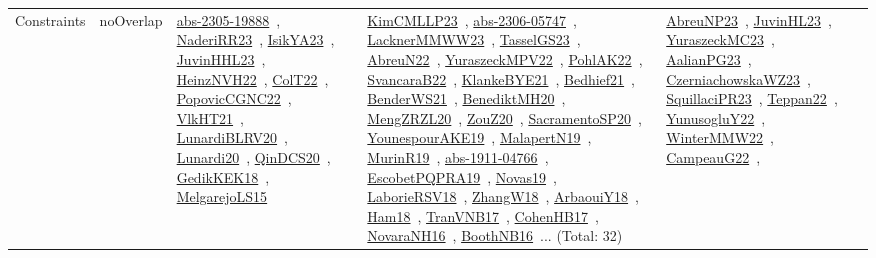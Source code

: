 {\begin{longtable}{lp{3cm}>{\raggedright\arraybackslash}p{6cm}>{\raggedright\arraybackslash}p{6cm}>{\raggedright\arraybackslash}p{8cm}}
Constraints & noOverlap & \href{works/abs-2305-19888.pdf}{abs-2305-19888}~\cite{abs-2305-19888}, \href{works/NaderiRR23.pdf}{NaderiRR23}~\cite{NaderiRR23}, \href{works/IsikYA23.pdf}{IsikYA23}~\cite{IsikYA23}, \href{works/JuvinHHL23.pdf}{JuvinHHL23}~\cite{JuvinHHL23}, \href{works/HeinzNVH22.pdf}{HeinzNVH22}~\cite{HeinzNVH22}, \href{works/ColT22.pdf}{ColT22}~\cite{ColT22}, \href{works/PopovicCGNC22.pdf}{PopovicCGNC22}~\cite{PopovicCGNC22}, \href{works/VlkHT21.pdf}{VlkHT21}~\cite{VlkHT21}, \href{works/LunardiBLRV20.pdf}{LunardiBLRV20}~\cite{LunardiBLRV20}, \href{works/Lunardi20.pdf}{Lunardi20}~\cite{Lunardi20}, \href{works/QinDCS20.pdf}{QinDCS20}~\cite{QinDCS20}, \href{works/GedikKEK18.pdf}{GedikKEK18}~\cite{GedikKEK18}, \href{works/MelgarejoLS15.pdf}{MelgarejoLS15}~\cite{MelgarejoLS15} & \href{works/KimCMLLP23.pdf}{KimCMLLP23}~\cite{KimCMLLP23}, \href{works/abs-2306-05747.pdf}{abs-2306-05747}~\cite{abs-2306-05747}, \href{works/LacknerMMWW23.pdf}{LacknerMMWW23}~\cite{LacknerMMWW23}, \href{works/TasselGS23.pdf}{TasselGS23}~\cite{TasselGS23}, \href{works/AbreuN22.pdf}{AbreuN22}~\cite{AbreuN22}, \href{works/YuraszeckMPV22.pdf}{YuraszeckMPV22}~\cite{YuraszeckMPV22}, \href{works/PohlAK22.pdf}{PohlAK22}~\cite{PohlAK22}, \href{works/SvancaraB22.pdf}{SvancaraB22}~\cite{SvancaraB22}, \href{works/KlankeBYE21.pdf}{KlankeBYE21}~\cite{KlankeBYE21}, \href{works/Bedhief21.pdf}{Bedhief21}~\cite{Bedhief21}, \href{works/BenderWS21.pdf}{BenderWS21}~\cite{BenderWS21}, \href{works/BenediktMH20.pdf}{BenediktMH20}~\cite{BenediktMH20}, \href{works/MengZRZL20.pdf}{MengZRZL20}~\cite{MengZRZL20}, \href{works/ZouZ20.pdf}{ZouZ20}~\cite{ZouZ20}, \href{works/SacramentoSP20.pdf}{SacramentoSP20}~\cite{SacramentoSP20}, \href{works/YounespourAKE19.pdf}{YounespourAKE19}~\cite{YounespourAKE19}, \href{works/MalapertN19.pdf}{MalapertN19}~\cite{MalapertN19}, \href{works/MurinR19.pdf}{MurinR19}~\cite{MurinR19}, \href{works/abs-1911-04766.pdf}{abs-1911-04766}~\cite{abs-1911-04766}, \href{works/EscobetPQPRA19.pdf}{EscobetPQPRA19}~\cite{EscobetPQPRA19}, \href{works/Novas19.pdf}{Novas19}~\cite{Novas19}, \href{works/LaborieRSV18.pdf}{LaborieRSV18}~\cite{LaborieRSV18}, \href{works/ZhangW18.pdf}{ZhangW18}~\cite{ZhangW18}, \href{works/ArbaouiY18.pdf}{ArbaouiY18}~\cite{ArbaouiY18}, \href{works/Ham18.pdf}{Ham18}~\cite{Ham18}, \href{works/TranVNB17.pdf}{TranVNB17}~\cite{TranVNB17}, \href{works/CohenHB17.pdf}{CohenHB17}~\cite{CohenHB17}, \href{works/NovaraNH16.pdf}{NovaraNH16}~\cite{NovaraNH16}, \href{works/BoothNB16.pdf}{BoothNB16}~\cite{BoothNB16}... (Total: 32) & \href{works/AbreuNP23.pdf}{AbreuNP23}~\cite{AbreuNP23}, \href{works/JuvinHL23.pdf}{JuvinHL23}~\cite{JuvinHL23}, \href{works/YuraszeckMC23.pdf}{YuraszeckMC23}~\cite{YuraszeckMC23}, \href{works/AalianPG23.pdf}{AalianPG23}~\cite{AalianPG23}, \href{works/CzerniachowskaWZ23.pdf}{CzerniachowskaWZ23}~\cite{CzerniachowskaWZ23}, \href{works/SquillaciPR23.pdf}{SquillaciPR23}~\cite{SquillaciPR23}, \href{works/Teppan22.pdf}{Teppan22}~\cite{Teppan22}, \href{works/YunusogluY22.pdf}{YunusogluY22}~\cite{YunusogluY22}, \href{works/WinterMMW22.pdf}{WinterMMW22}~\cite{WinterMMW22}, \href{works/CampeauG22.pdf}{CampeauG22}~\cite{CampeauG22}, 
\end{longtable}}
